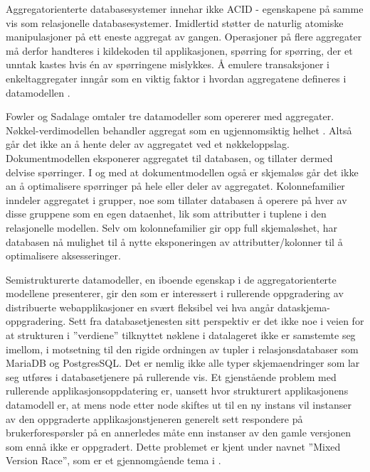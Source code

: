 Aggregatorienterte databasesystemer innehar ikke ACID - egenskapene på samme vis som relasjonelle databasesystemer. Imidlertid støtter de naturlig atomiske manipulasjoner på ett eneste aggregat av gangen. Operasjoner på flere aggregater må derfor handteres i kildekoden til applikasjonen, spørring for spørring, der et unntak kastes hvis én av spørringene mislykkes. Å emulere transaksjoner i enkeltaggregater inngår som en viktig faktor i hvordan aggregatene defineres i datamodellen \citep{sadalage2013}.

Fowler og Sadalage omtaler tre datamodeller som opererer med aggregater. Nøkkel-verdimodellen behandler aggregat som en ugjennomsiktig helhet \citep{sadalage2013}. Altså går det ikke an å hente deler av aggregatet ved et nøkkeloppslag. Dokumentmodellen eksponerer aggregatet til databasen, og tillater dermed delvise spørringer. I og med at dokumentmodellen også er skjemaløs går det ikke an å optimalisere spørringer på hele eller deler av aggregatet. Kolonnefamilier inndeler aggregatet i grupper, noe som tillater databasen å operere på hver av disse gruppene som en egen dataenhet, lik som attributter i tuplene i den relasjonelle modellen. Selv om kolonnefamilier gir opp full skjemaløshet, har databasen nå mulighet til å nytte eksponeringen av attributter/kolonner til å optimalisere aksesseringer.

Semistrukturerte datamodeller, en iboende egenskap i de aggregatorienterte modellene \cite{sadalage2013} presenterer, gir den som er interessert i rullerende oppgradering av distribuerte webapplikasjoner en svært fleksibel vei hva angår dataskjema-oppgradering. Sett fra databasetjenesten sitt perspektiv er det ikke noe i veien for at strukturen i ''verdiene'' tilknyttet nøklene i datalageret ikke er samstemte seg imellom, i motsetning til den rigide ordningen av tupler i relasjonsdatabaser som MariaDB og PostgresSQL. Det er nemlig ikke alle typer skjemaendringer som lar seg utføres i databasetjenere på rullerende vis. Et gjenstående problem med rullerende applikasjonsoppdatering er, uansett hvor strukturert applikasjonens datamodell er, at mens node etter node skiftes ut til en ny instans vil instanser av den oppgraderte applikasjonstjeneren generelt sett respondere på brukerforespørsler på en annerledes måte enn instanser av den gamle versjonen som ennå ikke er oppgradert. Dette problemet er kjent under navnet ''Mixed Version Race'', som er et gjennomgående tema i \cite{dumitras2010upgrade,dumitracs2009upgrades}.

